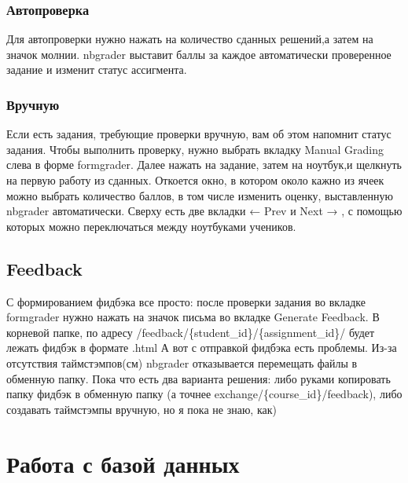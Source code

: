 \documentclass[a4paper,12pt]{article}
\begin{document}
\subsubsection{Автопроверка}

Для автопроверки нужно нажать на количество сданных решений,а затем на значок молнии. nbgrader выставит баллы за каждое автоматически проверенное задание и изменит статус ассигмента. 
\subsubsection{Вручную}

Если есть задания, требующие проверки вручную, вам об этом напомнит статус задания. Чтобы выполнить проверку, нужно выбрать вкладку Manual Grading слева в форме formgrader. Далее нажать на задание, затем на ноутбук,и щелкнуть на первую работу из сданных. Откоется окно, в котором около кажно из ячеек можно выбрать количество баллов, в том числе изменить оценку, выставленную nbgrader автоматически. Сверху есть две вкладки ← Prev и Next → , с помощью которых можно переключаться между ноутбуками учеников.
\subsection{Feedback}

С формированием фидбэка все просто: после проверки задания во вкладке formgrader нужно нажать на значок письма во вкладке Generate Feedback. В корневой папке, по адресу /feedback/\{student\_id\}/\{assignment\_id\}/ будет лежать фидбэк в формате .html
А вот с отправкой фидбэка есть проблемы. Из-за отсутствия таймстэмпов(см) nbgrader отказывается перемещать файлы в обменную папку. Пока что есть два варианта решения: либо руками копировать папку фидбэк в обменную папку (а точнее exchange/\{course\_id\}/feedback), либо создавать таймстэмпы вручную, но я пока не знаю, как)
\section{Работа с базой данных}
\end{document}
